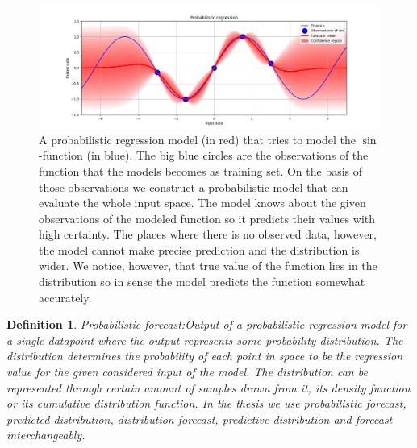 \documentclass[12pt,a4paper,twoside]{scrartcl}
\newtheorem{definition}[theorem]{Definition}
\numberwithin{equation}{section}
\begin{document}
\vfill
\begin{figure}[ht]
  \centering
  \includegraphics[height=0.5\textwidth, width=1\textwidth]{figures/probabilistic_regression.png}
  \caption[Probabilistic regression example model]{A probabilistic regression model (in red) that tries to model the \(\sin\)-function (in blue). The big blue circles are the observations of the function that the models becomes as training set. On the basis of those observations we construct a probabilistic model that can evaluate the whole input space. The model knows about the given observations of the modeled function so it predicts their values with high certainty. The places where there is no observed data, however, the model cannot make precise prediction and the distribution is wider. We notice, however, that true value of the function lies in the distribution so in sense the model predicts the function somewhat accurately.}\label{fig:prob-regression}
\end{figure}
\vspace{-2cm}
\begin{definition}{Probabilistic forecast:}\label{def:prob-for}
  Output of a probabilistic regression model for a single datapoint where the output represents some probability distribution. The distribution determines the probability of each point in space to be the regression value for the given considered input of the model. The distribution can be represented through certain amount of samples drawn from it, its density function or its cumulative distribution function. In the thesis we use probabilistic forecast, predicted distribution, distribution forecast, predictive distribution and forecast interchangeably.
\end{definition}
\vfill
\end{document}
